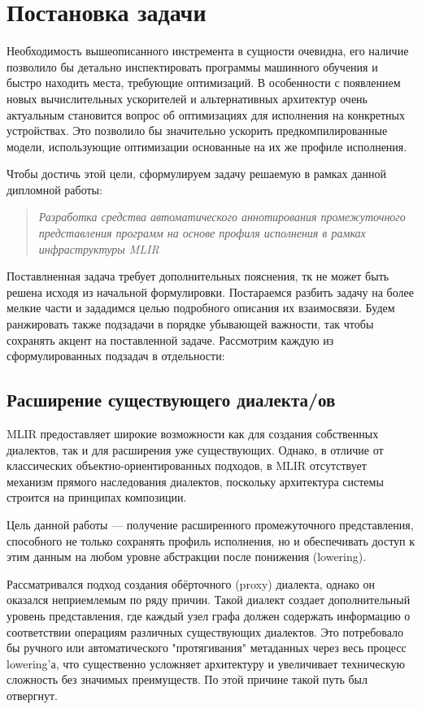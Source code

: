 \section{Постановка задачи}
\label{sec:Chapter1} 

Необходимость вышеописанного инстремента в сущности очевидна, его наличие позволило бы детально инспектировать программы машинного обучения и быстро находить места, требующие оптимизаций.
В особенности с появлением новых вычислительных ускорителей и альтернативных архитектур очень актуальным становится вопрос об оптимизациях для исполнения на конкретных устройствах.
Это позволило бы значительно ускорить предкомпилированные модели, использующие оптимизации основанные на их же профиле исполнения.

Чтобы достичь этой цели, сформулируем задачу решаемую в рамках данной дипломной работы:

\begin{quote}
\textit{Разработка средства автоматического аннотирования промежуточного представления программ на основе профиля исполнения в рамках инфраструктуры MLIR}
\end{quote}

Поставлненная задача требует дополнительных пояснения, тк не может быть решена исходя из начальной формулировки.
Постараемся разбить задачу на более мелкие части и зададимся целью подробного описания их взаимосвязи.
Будем ранжировать также подзадачи в порядке убывающей важности, так чтобы сохранять акцент на поставленной задаче.
Рассмотрим каждую из сформулированных подзадач в отдельности:

\subsection{Расширение существующего диалекта/ов}

MLIR предоставляет широкие возможности как для создания собственных диалектов, так и для расширения уже существующих.
Однако, в отличие от классических объектно-ориентированных подходов, в MLIR отсутствует механизм прямого наследования диалектов, поскольку архитектура системы строится на принципах композиции.

Цель данной работы — получение расширенного промежуточного представления, способного не только сохранять профиль исполнения, но и обеспечивать доступ к этим данным на любом уровне абстракции после понижения (lowering).

Рассматривался подход создания обёрточного (proxy) диалекта, однако он оказался неприемлемым по ряду причин. Такой диалект создает дополнительный уровень представления, где каждый узел графа должен содержать информацию о соответствии операциям различных существующих диалектов.
Это потребовало бы ручного или автоматического "протягивания" метаданных через весь процесс lowering'а, что существенно усложняет архитектуру и увеличивает техническую сложность без значимых преимуществ.
По этой причине такой путь был отвергнут.

